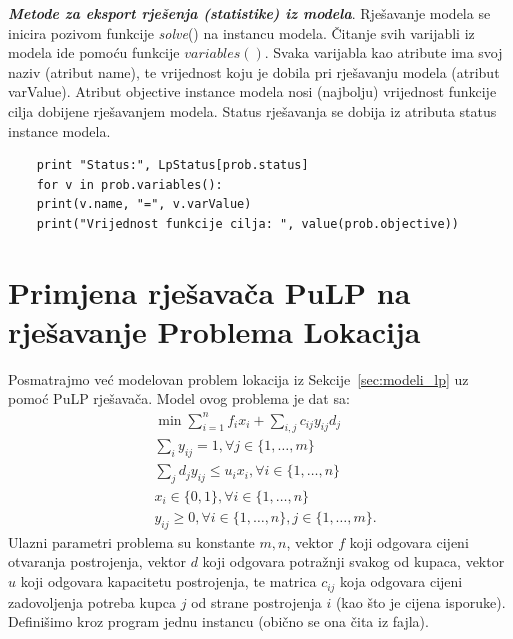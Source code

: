 \documentclass[a4paper, utf8, 11pt, colorlinks]{book}
\begin{document}
 \noindent \textbf{\emph{Metode za eksport rješenja (statistike) iz modela}}. Rješavanje modela se inicira pozivom funkcije \emph{solve}() na instancu modela. Čitanje svih varijabli iz modela ide pomoću funkcije $variables()$. Svaka varijabla kao atribute ima svoj naziv (atribut name), te vrijednost koju je dobila pri rješavanju modela (atribut varValue). Atribut objective instance modela nosi (najbolju) vrijednost funkcije cilja dobijene rješavanjem modela. Status rješavanja se dobija iz atributa status instance modela. 
 
 \begin{verbatim}
 	print "Status:", LpStatus[prob.status]
 	for v in prob.variables():
 	print(v.name, "=", v.varValue)
 	print("Vrijednost funkcije cilja: ", value(prob.objective))
 \end{verbatim}
 \section{Primjena rješavača PuLP na rješavanje Problema Lokacija}%
 Posmatrajmo već modelovan problem lokacija iz Sekcije~\ref{sec:modeli_lp} uz pomoć PuLP rješavača. Model ovog problema je dat sa:
 \begin{align*}
 	   & \min \sum_{i=1}^n f_i x_i  + \sum_{i,j} c_{ij} y_{ij} d_j  \\
 	   & \sum_{i} y_{ij} = 1, \forall j\in\{1,\ldots,m\} \\
 	   & \sum_{j} d_j y_{ij} \leq u_i x_i, \forall i \in \{1,\ldots,n\} \\
 	   & x_i \in \{0, 1\}, \forall i \in \{1, \ldots, n\} \\
 	   & y_{ij} \geq 0, \forall i \in \{1,\ldots,n \}, j \in \{1, \ldots, m\}.
 \end{align*}
 Ulazni parametri problema su konstante $m, n$, vektor $f$ koji odgovara cijeni otvaranja postrojenja, vektor $d$ koji odgovara potražnji svakog od kupaca, vektor $u$ koji odgovara kapacitetu postrojenja, te matrica $c_{ij}$ koja 
 odgovara cijeni zadovoljenja potreba kupca $j$ od strane postrojenja $i$ (kao što je cijena isporuke).  Definišimo kroz program jednu instancu (obično se ona čita iz fajla). 
\end{document}
